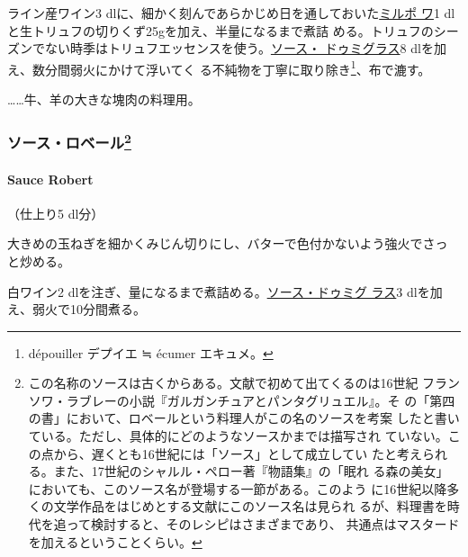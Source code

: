 \begin{recette}
  

ライン産ワイン3
dlに、細かく刻んであらかじめ日を通しておいた\protect\hyperlink{mirepoix}{ミルポ
ワ}1 dlと生トリュフの切りくず25gを加え、半量になるまで煮詰
める。トリュフのシーズンでない時季はトリュフエッセンスを使う。\protect\hyperlink{sauce-demi-glace}{ソース・
ドゥミグラス}8 dlを加え、数分間弱火にかけて浮いてく
る不純物を丁寧に取り除き\footnote{dépouiller デプイエ ≒ écumer
  エキュメ。}、布で漉す。

\ldots{}\ldots{}牛、羊の大きな塊肉の料理用。

\maeaki

\hypertarget{ux30bdux30fcux30b9ux30edux30d9ux30fcux30eb77}{%
\subsubsection[ソース・ロベール]{\texorpdfstring{ソース・ロベール\footnote{この名称のソースは古くからある。文献で初めて出てくるのは16世紀
  フランソワ・ラブレーの小説『ガルガンチュアとパンタグリュエル』。そ
  の「第四の書」において、ロベールという料理人がこの名のソースを考案
  したと書いている。ただし、具体的にどのようなソースかまでは描写され
  ていない。この点から、遅くとも16世紀には「ソース」として成立してい
  たと考えられる。また、17世紀のシャルル・ペロー著『物語集』の「眠れ
  る森の美女」においても、このソース名が登場する一節がある。このよう
  に16世紀以降多くの文学作品をはじめとする文献にこのソース名は見られ
  るが、料理書を時代を追って検討すると、そのレシピはさまざまであり、
  共通点はマスタードを加えるということくらい。}}{ソース・ロベール}}\label{ux30bdux30fcux30b9ux30edux30d9ux30fcux30eb77}}

\hypertarget{sauce-robert}{%
\paragraph{Sauce Robert}\label{sauce-robert}}

  

（仕上り5 dl分）

大きめの玉ねぎを細かくみじん切りにし、バターで色付かないよう強火でさっ
と炒める。

白ワイン2
dlを注ぎ、\untiers{}量になるまで煮詰める。\protect\hyperlink{sauce-demi-glace}{ソース・ドゥミグ
ラス}3 dlを加え、弱火で10分間煮る。


\end{recette}
